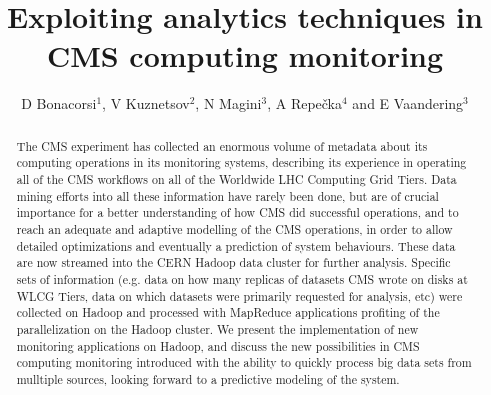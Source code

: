 \documentclass[a4paper]{jpconf}
\begin{document}
\title{Exploiting analytics techniques in CMS computing monitoring}

\author{D Bonacorsi$^1$, V Kuznetsov$^2$, N Magini$^3$, A Repe\v{c}ka$^4$ and E Vaandering$^3$}

\address{$^1$ Universit\`a di Bologna, Bologna, Italy}
\address{$^2$ Cornell University, Ithaca, NY, USA}
\address{$^3$ Fermi National Accelerator Laboratory, Batavia, IL, USA}
\address{$^4$ University of Vilnius, Vilnius, Lithuania}


\begin{abstract}
The CMS experiment has collected an enormous volume of metadata about its computing operations in its monitoring systems, describing its experience in operating all of the CMS workflows on all of the Worldwide LHC Computing Grid Tiers. Data mining efforts into all these information have rarely been done, but are of crucial importance for a better understanding of how CMS did successful operations, and to reach an adequate and adaptive modelling of the CMS operations, in order to allow detailed optimizations and eventually a prediction of system behaviours. These data are now streamed into the CERN Hadoop data cluster for further analysis. Specific sets of information (e.g. data on how many replicas of datasets CMS wrote on disks at WLCG Tiers, data on which datasets were primarily requested for analysis, etc) were collected on Hadoop and processed with MapReduce applications profiting of the parallelization on the Hadoop cluster. We present the implementation of new monitoring applications on Hadoop, and discuss the new possibilities in CMS computing monitoring introduced with the ability to quickly process big data sets from mulltiple sources, looking forward to a predictive modeling of the system.
\end{abstract}
\end{document}
